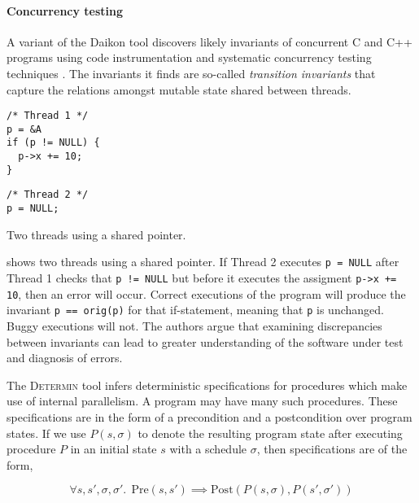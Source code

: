 \paragraph{Concurrency testing}
A variant of the Daikon tool discovers likely invariants of concurrent
C and C++ programs using code instrumentation and systematic
concurrency testing techniques \parencite{kusano2015}.  The invariants it
finds are so-called \emph{transition invariants} that capture the
relations amongst mutable state shared between threads.

\begin{listing}
\centering
\begin{minipage}[t]{0.3\textwidth}
\begin{verbatim}
/* Thread 1 */
p = &A
if (p != NULL) {
  p->x += 10;
}
\end{verbatim}
\end{minipage}
\begin{minipage}[t]{0.3\textwidth}
\begin{verbatim}
/* Thread 2 */
p = NULL;
\end{verbatim}
\end{minipage}
\caption{Two threads using a shared pointer.}\label{lst:cthreads}
\end{listing}

 shows two threads using a shared pointer.  If
Thread 2 executes \verb|p = NULL| after Thread 1 checks that
\verb|p != NULL| but before it executes the assigment
\verb|p->x += 10|, then an error will occur.  Correct executions of
the program will produce the invariant \verb|p == orig(p)| for that
if-statement, meaning that \verb|p| is unchanged.  Buggy executions
will not.  The authors argue that examining discrepancies between
invariants can lead to greater understanding of the software under
test and diagnosis of errors.

The \textsc{Determin} tool \parencite{burnim2010} infers deterministic
specifications for procedures which make use of internal parallelism.
A program may have many such procedures.  These specifications are in
the form of a precondition and a postcondition over program states.
If we use $P(s, \sigma)$ to denote the resulting program state after
executing procedure $P$ in an initial state $s$ with a schedule
$\sigma$, then specifications are of the form,

\[
\forall s, s', \sigma, \sigma'.~~
\mathrm{Pre}\left(s, s'\right) \implies
\mathrm{Post}\left(P\left(s,\sigma\right),P\left(s', \sigma'\right)\right)
\]

